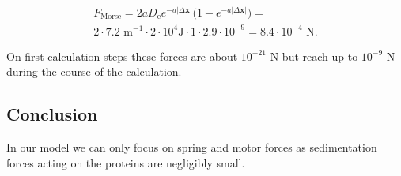 \begin{equation}
\begin{split}
F_\text{Morse} = 2aD_{\text{e}}e^{- a |\Delta \mathbf{x}|}\big(1 - e^{- a |\Delta \mathbf{x}|}\big) =\\
2 \cdot 7.2 \text{ m}^{-1} \cdot 2 \cdot 10^{4} \text{J} \cdot 1 \cdot 2.9 \cdot 10^{-9} = 8.4 \cdot 10^{-4} \text{ N}.
\end{split}
\end{equation}

On first calculation steps these forces are about $10^{-21} \text{ N}$ but reach up to $10^{-9} \text{ N}$ during the course of the calculation.

\subsection{Conclusion}

In our model we can only focus on spring and motor forces as sedimentation forces acting on the proteins are negligibly small.

